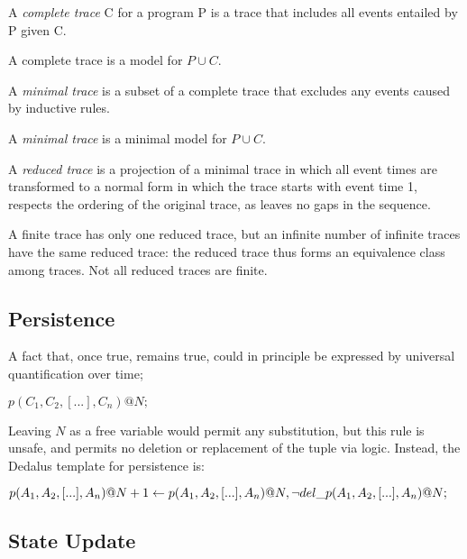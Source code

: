 \documentclass{acm_proc_article-sp-sigmod09}
\newenvironment{Dedalus}{
\vspace{0.5em}\begin{minipage}{0.95\textwidth}%
\begin{alltt}\fontsize{9pt}{9pt}\selectfont}
{\end{alltt}\end{minipage}\vspace{0.5em}}
\begin{document}
\begin{definition}
A \emph{complete trace} C for a program P is a trace that includes all events entailed by P given C.
\end{definition}

A complete trace is a model for $P \cup C$.

\begin{definition}
A \emph{minimal trace} is a subset of a complete trace that excludes any events caused by inductive rules.
\end{definition}

A \emph{minimal trace} is a minimal model for $P \cup C$.

\begin{definition}
A \emph{reduced trace} is a projection of a minimal trace in which all event times are transformed
to a normal form in which the trace starts with event time 1, respects the ordering of the original trace, as leaves no gaps in the sequence.
\end{definition}

A finite trace has only one reduced trace, but an infinite number of infinite traces have the same reduced trace: the reduced trace thus forms an 
equivalence class among traces.  Not all reduced traces are finite.

\subsection{Persistence}

A fact that, once true, remains true, could in principle be expressed by universal quantification over time;

$p(C_1,C_{2},[...],C_{n})@N;$

Leaving $N$ as a free variable would permit any substitution, but this rule is unsafe, and permits no deletion or replacement 
of the tuple via logic.  Instead, the Dedalus template for persistence is:

$p(A_{1}, A_{2}, [...], A_{n})@N+1 \leftarrow \\
  p(A_{1}, A_{2}, [...], A_{n})@N, \\
  \lnot del\_p(A_{1}, A_{2}, [...], A_{n})@N;
  $

\subsection{State Update}
\end{document}
